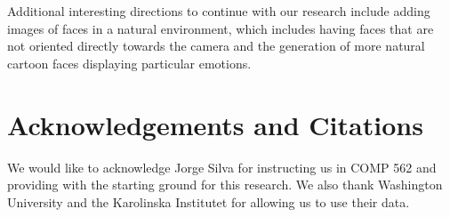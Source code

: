 \documentclass{Project}
\begin{document}
Additional interesting directions to continue with our research include adding images of faces in a natural
environment, which includes having faces that are not oriented directly towards the camera and the generation
of more natural cartoon faces displaying particular emotions. 

%


\section{Acknowledgements and Citations}
We would like to acknowledge Jorge Silva for instructing us in COMP 562 and providing
with the starting ground for this research. We also thank Washington University and 
the Karolinska Institutet for allowing us to use their data.


%
%

\end{document}
